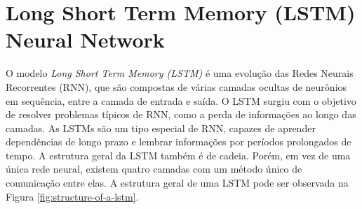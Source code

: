   	\begin{figure}[h!] 
   	    \captionsetup{width=10cm}%
	\end{figure}

 \section{Long Short Term Memory (LSTM) Neural Network}

O modelo \textit{Long Short Term Memory (LSTM)} é uma evolução das Redes Neurais Recorrentes (RNN), que são compostas de várias camadas ocultas de neurônios em sequência, entre a camada de entrada e saída. O LSTM surgiu com o objetivo de resolver problemas típicos de RNN, como a perda de informações ao longo das camadas. As LSTMs são um tipo especial de RNN, capazes de aprender dependências de longo prazo e lembrar informações por períodos prolongados de tempo. A estrutura geral da LSTM também é de cadeia. Porém, em vez de uma única rede neural, existem quatro camadas com um método único de comunicação entre elas. A estrutura geral de uma LSTM pode ser observada na Figura \ref{fig:structure-of-a-lstm}.

